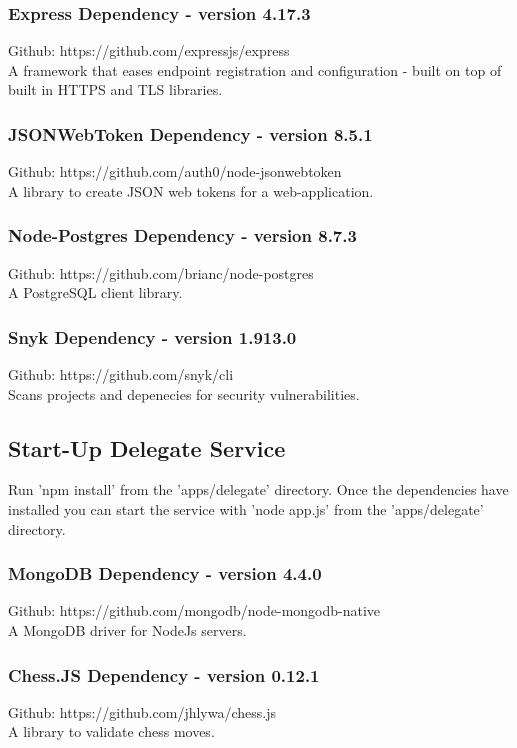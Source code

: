 \documentclass[12pt]{article}
\begin{document}
\subsubsection{Express Dependency - version 4.17.3}
Github: https://github.com/expressjs/express\\
A framework that eases endpoint registration and configuration - built on top of built in HTTPS and TLS libraries.

\subsubsection{JSONWebToken Dependency - version 8.5.1}
Github: https://github.com/auth0/node-jsonwebtoken\\
A library to create JSON web tokens for a web-application.

\subsubsection{Node-Postgres Dependency - version 8.7.3}
Github: https://github.com/brianc/node-postgres\\
A PostgreSQL client library.

\subsubsection{Snyk Dependency - version 1.913.0}
Github: https://github.com/snyk/cli\\
Scans projects and depenecies for security vulnerabilities.

\subsection{Start-Up Delegate Service}
Run 'npm install' from the 'apps/delegate' directory. Once the dependencies have installed you can start the service with 'node app.js' from the 'apps/delegate' directory.

\subsubsection{MongoDB Dependency - version 4.4.0}
Github: https://github.com/mongodb/node-mongodb-native\\
A MongoDB driver for NodeJs servers.

\subsubsection{Chess.JS Dependency - version 0.12.1}
Github: https://github.com/jhlywa/chess.js\\
A library to validate chess moves.
\end{document}
